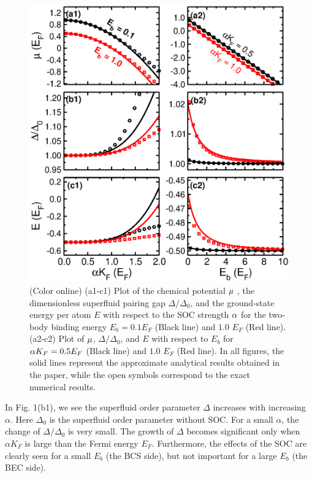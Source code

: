 \documentclass[pra,print,showpacs,superscriptaddress,twocolumn]{revtex4}
\begin{document}
\begin{figure}[bp]
\includegraphics[width = 1\linewidth]{FIG1.eps}
\caption{(Color online) (a1-c1) Plot of the chemical potential $\protect\mu $%
, the dimensionless superfluid pairing gap $\Delta /\Delta _{0}$, and the
ground-state energy per atom $E$ with respect to the SOC strength $\protect%
\alpha $ for the two-body binding energy $E_{b}=0.1E_{F}$ (Black line) and $%
1.0$ $E_{F}$ (Red line). (a2-c2) Plot of $\protect\mu $, $\Delta /\Delta
_{0} $, and $E$ with respect to $E_{b}$ for $\protect\alpha K_{F}=0.5E_{F}$
(Black line) and $1.0$ $E_{F}$ (Red line). In all figures, the solid lines
represent the approximate analytical results obtained in the paper, while
the open symbols correspond to the exact numerical results.}
\label{fig1}
\end{figure}

In Fig. 1(b1), we see the superfluid order parameter $\Delta $ increases
with increasing $\alpha $. Here $\Delta _{0}$ is the superfluid order
parameter without SOC. For a small $\alpha $, the change of $\Delta /\Delta
_{0}$ is very small. The growth of $\Delta $ becomes significant only when $%
\alpha K_{F}$ is large than the Fermi energy $E_{F}$. Furthermore, the
effects of the SOC are clearly seen for a small $E_{b}$ (the BCS side), but
not important for a large $E_{b}$ (the BEC side).
\end{document}
